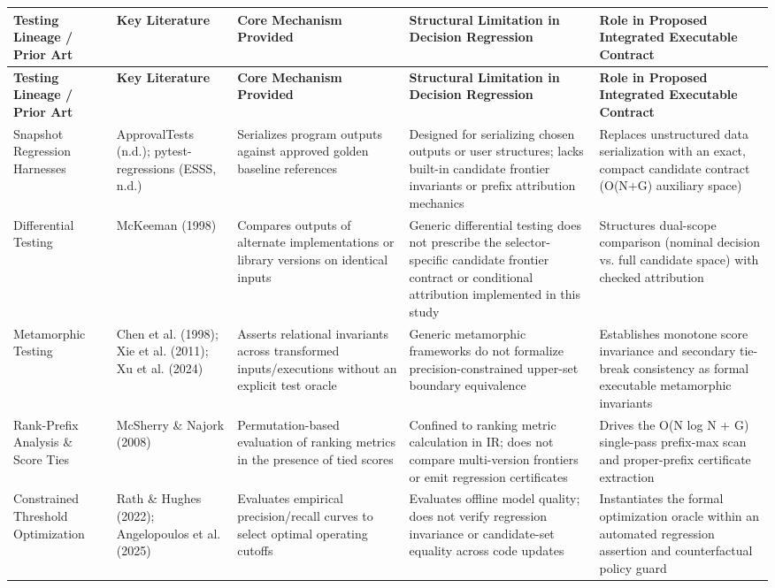 \documentclass[11pt,a4paper]{article}
\begin{document}
{\footnotesize
\setlength{\tabcolsep}{3pt}
\renewcommand{\arraystretch}{1.15}
\begin{longtable}{>{\raggedright\arraybackslash}p{0.20000\dimexpr\textwidth-10\tabcolsep\relax}>{\raggedright\arraybackslash}p{0.20000\dimexpr\textwidth-10\tabcolsep\relax}>{\raggedright\arraybackslash}p{0.20000\dimexpr\textwidth-10\tabcolsep\relax}>{\raggedright\arraybackslash}p{0.20000\dimexpr\textwidth-10\tabcolsep\relax}>{\raggedright\arraybackslash}p{0.20000\dimexpr\textwidth-10\tabcolsep\relax}}
\toprule
\textbf{Testing Lineage / Prior Art} & \textbf{Key Literature} & \textbf{Core Mechanism Provided} & \textbf{Structural Limitation in Decision Regression} & \textbf{Role in Proposed Integrated Executable Contract} \\
\midrule
\endfirsthead
\toprule
\textbf{Testing Lineage / Prior Art} & \textbf{Key Literature} & \textbf{Core Mechanism Provided} & \textbf{Structural Limitation in Decision Regression} & \textbf{Role in Proposed Integrated Executable Contract} \\
\midrule
\endhead
Snapshot Regression Harnesses & ApprovalTests (n.d.); pytest-regressions (ESSS, n.d.) & Serializes program outputs against approved golden baseline references & Designed for serializing chosen outputs or user structures; lacks built-in candidate frontier invariants or prefix attribution mechanics & Replaces unstructured data serialization with an exact, compact candidate contract (O(N+G) auxiliary space) \\
Differential Testing & McKeeman (1998) & Compares outputs of alternate implementations or library versions on identical inputs & Generic differential testing does not prescribe the selector-specific candidate frontier contract or conditional attribution implemented in this study & Structures dual-scope comparison (nominal decision vs. full candidate space) with checked attribution \\
Metamorphic Testing & Chen et al. (1998); Xie et al. (2011); Xu et al. (2024) & Asserts relational invariants across transformed inputs/executions without an explicit test oracle & Generic metamorphic frameworks do not formalize precision-constrained upper-set boundary equivalence & Establishes monotone score invariance and secondary tie-break consistency as formal executable metamorphic invariants \\
Rank-Prefix Analysis \& Score Ties & McSherry \& Najork (2008) & Permutation-based evaluation of ranking metrics in the presence of tied scores & Confined to ranking metric calculation in IR; does not compare multi-version frontiers or emit regression certificates & Drives the O(N log N + G) single-pass prefix-max scan and proper-prefix certificate extraction \\
Constrained Threshold Optimization & Rath \& Hughes (2022); Angelopoulos et al. (2025) & Evaluates empirical precision/recall curves to select optimal operating cutoffs & Evaluates offline model quality; does not verify regression invariance or candidate-set equality across code updates & Instantiates the formal optimization oracle within an automated regression assertion and counterfactual policy guard \\
\bottomrule
\end{longtable}
}
\end{document}
